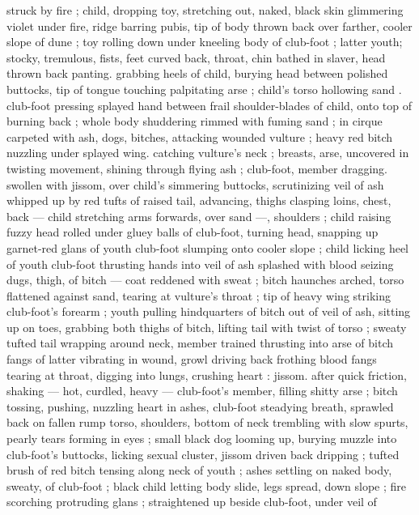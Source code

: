 struck by fire ; child, dropping toy, stretching out, naked, black skin 
glimmering violet under fire, ridge barring pubis, tip of body thrown 
back over farther, cooler slope of dune ; toy rolling down under 
kneeling body of club-foot ; latter youth; stocky, tremulous, fists, feet 
curved back, throat, chin bathed in slaver, head thrown back panting. 
grabbing heels of child, burying head between polished buttocks, tip 
of tongue touching palpitating arse ; child's torso hollowing sand . 
club-foot pressing splayed hand between frail shoulder-blades of 
child, onto top of burning back ; whole body shuddering rimmed with 
fuming sand ; in cirque carpeted with ash, dogs, bitches, attacking 
wounded vulture ; heavy red bitch nuzzling under splayed wing. 
catching vulture's neck ; breasts, arse, uncovered in twisting 
movement, shining through flying ash ; club-foot, member dragging. 
swollen with jissom, over child's simmering buttocks, scrutinizing veil 
of ash whipped up by red tufts of raised tail, advancing, thighs 
clasping loins, chest, back --- child stretching arms forwards, over 
sand ---, shoulders ; child raising fuzzy head rolled under gluey balls 
of club-foot, turning head, snapping up garnet-red glans of youth 
club-foot slumping onto cooler slope ; child licking heel of youth 
club-foot thrusting hands into veil of ash splashed with blood 
seizing dugs, thigh, of bitch --- coat reddened with sweat ; bitch 
haunches arched, torso flattened against sand, tearing at vulture's 
throat ; tip of heavy wing striking club-foot's forearm ; youth pulling 
hindquarters of bitch out of veil of ash, sitting up on toes, grabbing 
both thighs of bitch, lifting tail with twist of torso ; sweaty tufted tail 
wrapping around neck, member trained thrusting into arse of bitch 
fangs of latter vibrating in wound, growl driving back frothing blood 
fangs tearing at throat, digging into lungs, crushing heart : jissom. 
after quick friction, shaking --- hot, curdled, heavy --- club-foot's 
member, filling shitty arse ; bitch tossing, pushing, nuzzling heart in 
ashes, club-foot steadying breath, sprawled back on fallen rump 
torso, shoulders, bottom of neck trembling with slow spurts, pearly 
tears forming in eyes ; small black dog looming up, burying muzzle 
into club-foot's buttocks, licking sexual cluster, jissom driven back 
dripping ; tufted brush of red bitch tensing along neck of youth ; 
ashes settling on naked body, sweaty, of club-foot ; black child 
letting body slide, legs spread, down slope ; fire scorching 
protruding glans ; straightened up beside club-foot, under veil of 
